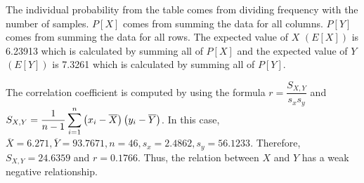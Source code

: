 The individual probability from the table comes from dividing frequency with the number of samples. $P[X]$ comes from summing the data for all columns. $P[Y]$ comes from summing the data for all rows. The expected value of $X$ $(E[X])$ is 6.23913 which is calculated by summing all of $P[X]$ and the expected value of $Y$ $(E[Y])$ is 7.3261 which is calculated by summing all of $P[Y]$.\\
\begin{figure}[ht]
\end{figure}
The correlation coefficient is computed by using the formula \(r = \dfrac{S_{X, Y}}{s_xs_y}\) and \(S_{X, Y}=\dfrac{1}{n-1}\displaystyle\sum\limits^n_{i=1}\left(x_i-\overline{X}\right)\left(y_i-\overline{Y}\right)\). In this case, \(\overline{X} = 6.271, \overline{Y} = 93.7671, n = 46, s_x = 2.4862, s_y = 56.1233\). Therefore, \(S_{X, Y} = 24.6359\) and \(r = 0.1766\). Thus, the relation between $X$ and $Y$ has a weak negative relationship.\\
